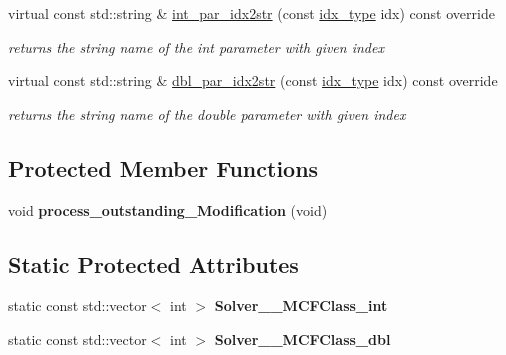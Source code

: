 \begin{Indent}
\begin{DoxyCompactItemize}
virtual const std\+::string \& \mbox{\hyperlink{class_s_m_spp__di__unipi__it_1_1_m_c_f_solver_a61e973f39747f63b8f56d97cc62e32ce}{int\+\_\+par\+\_\+idx2str}} (const \mbox{\hyperlink{class_s_m_spp__di__unipi__it_1_1_thin_compute_interface_aa3d710629ad8c434286726ad810c3b47}{idx\+\_\+type}} idx) const override
\begin{DoxyCompactList}\small\item\em returns the string name of the int parameter with given index \end{DoxyCompactList}\item 
virtual const std\+::string \& \mbox{\hyperlink{class_s_m_spp__di__unipi__it_1_1_m_c_f_solver_a93f1297e7910e91cc18b303376191026}{dbl\+\_\+par\+\_\+idx2str}} (const \mbox{\hyperlink{class_s_m_spp__di__unipi__it_1_1_thin_compute_interface_aa3d710629ad8c434286726ad810c3b47}{idx\+\_\+type}} idx) const override
\begin{DoxyCompactList}\small\item\em returns the string name of the double parameter with given index \end{DoxyCompactList}\end{DoxyCompactItemize}
\end{Indent}
\subsection*{Protected Member Functions}
\begin{DoxyCompactItemize}
\item 
\mbox{\label{class_s_m_spp__di__unipi__it_1_1_m_c_f_solver_abceba91167d73a6196c7c2087308b00e}} 
void {\bfseries process\+\_\+outstanding\+\_\+\+Modification} (void)
\end{DoxyCompactItemize}
\subsection*{Static Protected Attributes}
\begin{DoxyCompactItemize}
\item 
\mbox{\label{class_s_m_spp__di__unipi__it_1_1_m_c_f_solver_afd1ba61d3df60cdf49b9d7ac8cdd35fa}} 
static const std\+::vector$<$ int $>$ {\bfseries Solver\+\_\+\_\+\+M\+C\+F\+Class\+\_\+int}
\item 
\mbox{\label{class_s_m_spp__di__unipi__it_1_1_m_c_f_solver_a7b7a1948769b34b52d85e1f78e9746db}} 
static const std\+::vector$<$ int $>$ {\bfseries Solver\+\_\+\_\+\+M\+C\+F\+Class\+\_\+dbl}
\end{DoxyCompactItemize}
